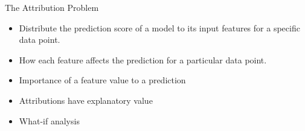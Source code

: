 \begin{frame}{The Attribution Problem\footnotemark}
	\begin{itemize}\setlength\itemsep{2em}
		\item<1-> Distribute the prediction score of a model to its input features for a specific data point.
		\item<2-> How each feature affects the prediction for a particular data point.
		\item<3-> Importance of a feature value to a prediction
		\item<4-> Attributions have explanatory value
		\item<5-> What-if analysis
	\end{itemize}
\end{frame}